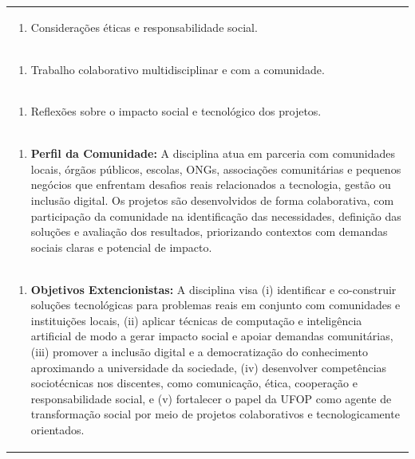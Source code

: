 \documentclass[11pt]{article}
\begin{document}
\begin{center}
\begin{longtable}{|p{4cm}|p{4cm}|p{4cm}|p{4cm}|}
\multicolumn{4}{|p{\dimexpr 16cm + 6\tabcolsep\relax}|}{\begin{enumerate}[start=8]\item Considerações éticas e responsabilidade social.\end{enumerate}}\\
\multicolumn{4}{|p{\dimexpr 16cm + 6\tabcolsep\relax}|}{\begin{enumerate}[start=9]\item Trabalho colaborativo multidisciplinar e com a comunidade.\end{enumerate}}\\
\multicolumn{4}{|p{\dimexpr 16cm + 6\tabcolsep\relax}|}{\begin{enumerate}[start=10]\item Reflexões sobre o impacto social e tecnológico dos projetos.\end{enumerate}}\\
\multicolumn{4}{|p{\dimexpr 16cm + 6\tabcolsep\relax}|}{\begin{enumerate}[start=11]\item \textbf{Perfil da Comunidade:} A disciplina atua em parceria com comunidades locais, órgãos públicos, escolas, ONGs, associações comunitárias e pequenos negócios que enfrentam desafios reais relacionados a tecnologia, gestão ou inclusão digital. Os projetos são desenvolvidos de forma colaborativa, com participação da comunidade na identificação das necessidades, definição das soluções e avaliação dos resultados, priorizando contextos com demandas sociais claras e potencial de impacto.\end{enumerate}}\\
\multicolumn{4}{|p{\dimexpr 16cm + 6\tabcolsep\relax}|}{\begin{enumerate}[start=12]\item \textbf{Objetivos Extencionistas:} A disciplina visa (i) identificar e co-construir soluções tecnológicas para problemas reais em conjunto com comunidades e instituições locais, (ii) aplicar técnicas de computação e inteligência artificial de modo a gerar impacto social e apoiar demandas comunitárias, (iii) promover a inclusão digital e a democratização do conhecimento aproximando a universidade da sociedade, (iv) desenvolver competências sociotécnicas nos discentes, como comunicação, ética, cooperação e responsabilidade social, e (v) fortalecer o papel da UFOP como agente de transformação social por meio de projetos colaborativos e tecnologicamente orientados.\end{enumerate}}\\

\end{longtable}
\end{center}
\end{document}

